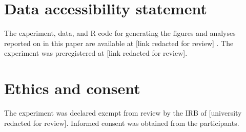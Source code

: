\documentclass[11pt,fleqn]{article}
\newcommand{\jd}[1]{\textcolor{Pink}{[jd: #1]}}
\newcommand{\6}{\mbox{$[\hspace*{-.6mm}[$}}
\newcommand{\9}{\mbox{$]\hspace*{-.6mm}]$}}
\begin{document}

\section*{Data accessibility statement}

The experiment, data, and R code for generating the figures and analyses reported on in this paper are available at [link redacted for review]
. The experiment was preregistered at [link redacted for review].

\section*{Ethics and consent}

The experiment was declared exempt from review by the IRB of [university redacted for review]. Informed consent was obtained from the participants.



%



\newpage

\appendix

\setcounter{table}{0}
\renewcommand{\thetable}{A\arabic{table}}

\setcounter{figure}{0}
\renewcommand{\thefigure}{A\arabic{figure}}
\end{document}
